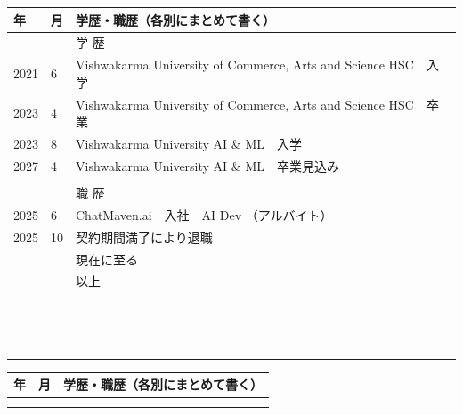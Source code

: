 \documentclass[9pt,a4paper]{article}
\begin{document}
\noindent
\begin{tabularx}{\textwidth}{|p{16mm}|p{10mm}|X|}
\hline
\centering 年 & \centering 月 & \centering 学歴・職歴（各別にまとめて書く） \tabularnewline \hline
& & \centering 学 歴 \tabularnewline
2021 & 6  & Vishwakarma University of Commerce, Arts and Science HSC　入学 \\
2023 & 4  & Vishwakarma University of Commerce, Arts and Science HSC　卒業 \\
2023 & 8  & Vishwakarma University AI \& ML　入学 \\
2027 & 4  & Vishwakarma University AI \& ML　卒業見込み \\
& & \\
& & \centering 職 歴 \tabularnewline
2025 & 6  & ChatMaven.ai　入社　AI Dev （アルバイト） \\
2025 & 10 & 契約期間満了により退職 \\
& & \hfill 現在に至る \tabularnewline
& & \hfill 以上 \tabularnewline
\rule{0pt}{14pt} & & \\
\rule{0pt}{14pt} & & \\
\rule{0pt}{14pt} & & \\
\rule{0pt}{14pt} & & \\
\rule{0pt}{14pt} & & \\
\rule{0pt}{14pt} & & \\
\rule{0pt}{14pt} & & \\
\rule{0pt}{14pt} & & \\
\rule{0pt}{14pt} & & \\
\rule{0pt}{14pt} & & \\
\rule{0pt}{14pt} & & \\
\rule{0pt}{14pt} & & \\
\rule{0pt}{14pt} & & \\
\rule{0pt}{14pt} & & \\
\hline
\end{tabularx}

\newpage

\noindent
\begin{tabularx}{\textwidth}{|p{16mm}|p{10mm}|X|}
\hline
\centering 年 & \centering 月 & \centering 学歴・職歴（各別にまとめて書く） \tabularnewline \hline
\rule{0pt}{14pt} & & \\
\rule{0pt}{14pt} & & \\
\hline
\end{tabularx}
\vspace*{-0.5pt}
\end{document}
